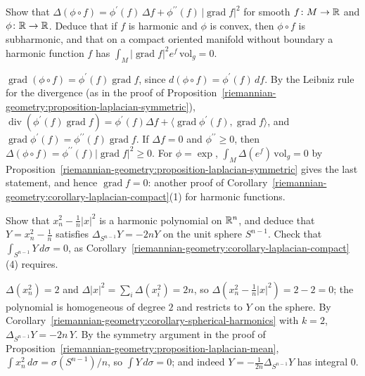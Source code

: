 \begin{exercise}\label{riemannian-geometry:exercise-laplacian-composition}
Show that $\Delta(\phi \circ f) = \phi^{\prime}(f)\,\Delta f + \phi^{\prime\prime}(f)\,|\operatorname{grad}f|^2$ for smooth $f \colon M \to \mathbb{R}$ and $\phi \colon \mathbb{R} \to \mathbb{R}$. Deduce that if $f$ is harmonic and
$\phi$ is convex, then $\phi \circ f$ is subharmonic, and that on a compact oriented manifold without boundary a harmonic function $f$ has $\int_M|\operatorname{grad}f|^2e^{f}\,\mathrm{vol}_g = 0$.
\end{exercise}

\begin{solution}
$\operatorname{grad}(\phi \circ f) = \phi^{\prime}(f)\operatorname{grad}f$, since $d(\phi \circ f) = \phi^{\prime}(f)\,df$. By the Leibniz rule for the divergence
(as in the proof of Proposition~\ref{riemannian-geometry:proposition-laplacian-symmetric}), $\operatorname{div}(\phi^{\prime}(f)\operatorname{grad}f) = \phi^{\prime}(f)\Delta f + \langle\operatorname{grad}\phi^{\prime}(f), \operatorname{grad}f\rangle$, and
$\operatorname{grad}\phi^{\prime}(f) = \phi^{\prime\prime}(f)\operatorname{grad}f$. If $\Delta f = 0$ and $\phi^{\prime\prime} \geq 0$, then $\Delta(\phi \circ f) = \phi^{\prime\prime}(f)|\operatorname{grad}f|^2 \geq 0$. For $\phi = \exp$,
$\int_M\Delta(e^f)\,\mathrm{vol}_g = 0$ by Proposition~\ref{riemannian-geometry:proposition-laplacian-symmetric} gives the last statement, and hence $\operatorname{grad}f = 0$: another proof of
Corollary~\ref{riemannian-geometry:corollary-laplacian-compact}(1) for harmonic functions.
\end{solution}

\begin{exercise}\label{riemannian-geometry:exercise-spherical-harmonic-quadratic}
Show that $x_n^2 - \frac1n|x|^2$ is a harmonic polynomial on $\mathbb{R}^n$, and deduce that $Y = x_n^2 - \frac1n$ satisfies $\Delta_{S^{n-1}}Y = -2nY$ on the unit sphere $S^{n-1}$. Check that
$\int_{S^{n-1}}Y\,d\sigma = 0$, as Corollary~\ref{riemannian-geometry:corollary-laplacian-compact}(4) requires.
\end{exercise}

\begin{solution}
$\Delta(x_n^2) = 2$ and $\Delta|x|^2 = \sum_i\Delta(x_i^2) = 2n$, so $\Delta(x_n^2 - \frac1n|x|^2) = 2 - 2 = 0$; the polynomial is homogeneous of degree $2$ and restricts to $Y$ on the sphere. By
Corollary~\ref{riemannian-geometry:corollary-spherical-harmonics} with $k = 2$, $\Delta_{S^{n-1}}Y = -2n\,Y$. By the symmetry argument in the proof of
Proposition~\ref{riemannian-geometry:proposition-laplacian-mean}, $\int x_n^2\,d\sigma = \sigma(S^{n-1})/n$, so $\int Y\,d\sigma = 0$; and indeed $Y = -\frac{1}{2n}\Delta_{S^{n-1}}Y$ has integral $0$.
\end{solution}

